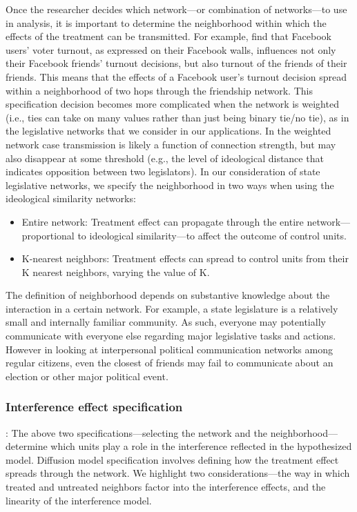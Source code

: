 \documentclass[12pt]{article}
\begin{document}
Once the researcher decides which network---or combination of networks---to use in analysis, it is important to determine the neighborhood within which the effects of the treatment can be transmitted. For example, \cite{Bond:2012} find that Facebook users' voter turnout, as expressed on their Facebook walls, influences not only their Facebook friends' turnout decisions, but also turnout of the friends of their friends. This means that the effects of a Facebook user's turnout decision spread within a neighborhood of two hops through the friendship network. This specification decision becomes more complicated when the network is weighted (i.e., ties can take on many values rather than just being binary tie/no tie), as in the legislative networks that we consider in our applications. In the weighted network case transmission is likely a function of connection strength, but may also disappear at some threshold (e.g., the level of ideological distance that indicates opposition between two legislators).  In our consideration of state legislative networks, we specify the neighborhood in two ways when using the ideological similarity networks:
\begin{itemize}
\item Entire network: Treatment effect can propagate through the entire network---proportional to ideological similarity---to affect the outcome of control units. 
\item K-nearest neighbors: Treatment effects can spread to control units from their K nearest neighbors, varying the value of K.
\end{itemize}

The definition of neighborhood depends on substantive knowledge about the interaction in a certain network. For example, a state legislature is a relatively small and internally familiar community. As such, everyone may potentially communicate with everyone else regarding major legislative tasks and actions. However in looking at interpersonal political communication networks among regular citizens, even the closest of friends may fail to communicate about an election or other major political event.


 \subsubsection{Interference effect specification}:
The above two specifications---selecting the network and the neighborhood---determine which units play a role in the interference reflected in the hypothesized model. Diffusion model specification involves defining how the treatment effect spreads through the network. We highlight two considerations---the way in which treated and untreated neighbors factor into the interference effects, and the linearity of the interference model. 
\end{document}
